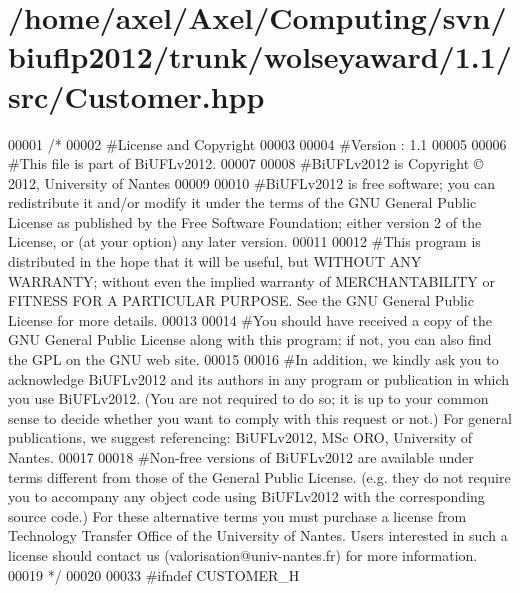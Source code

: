 \hypertarget{Customer_8hpp_source}{\section{/home/axel/\-Axel/\-Computing/svn/biuflp2012/trunk/wolseyaward/1.1/src/\-Customer.hpp}
}

\begin{DoxyCode}
00001 \textcolor{comment}{/*}
00002 \textcolor{comment}{ #License and Copyright}
00003 \textcolor{comment}{ }
00004 \textcolor{comment}{ #Version : 1.1}
00005 \textcolor{comment}{ }
00006 \textcolor{comment}{ #This file is part of BiUFLv2012.}
00007 \textcolor{comment}{ }
00008 \textcolor{comment}{ #BiUFLv2012 is Copyright © 2012, University of Nantes}
00009 \textcolor{comment}{ }
00010 \textcolor{comment}{ #BiUFLv2012 is free software; you can redistribute it and/or modify it under
       the terms of the GNU General Public License as published by the Free Software
       Foundation; either version 2 of the License, or (at your option) any later version.}
00011 \textcolor{comment}{ }
00012 \textcolor{comment}{ #This program is distributed in the hope that it will be useful, but WITHOUT
       ANY WARRANTY; without even the implied warranty of MERCHANTABILITY or FITNESS FOR
       A PARTICULAR PURPOSE. See the GNU General Public License for more details.}
00013 \textcolor{comment}{ }
00014 \textcolor{comment}{ #You should have received a copy of the GNU General Public License along with
       this program; if not, you can also find the GPL on the GNU web site.}
00015 \textcolor{comment}{ }
00016 \textcolor{comment}{ #In addition, we kindly ask you to acknowledge BiUFLv2012 and its authors in
       any program or publication in which you use BiUFLv2012. (You are not required to
       do so; it is up to your common sense to decide whether you want to comply with
       this request or not.) For general publications, we suggest referencing: 
       BiUFLv2012, MSc ORO, University of Nantes.}
00017 \textcolor{comment}{ }
00018 \textcolor{comment}{ #Non-free versions of BiUFLv2012 are available under terms different from
       those of the General Public License. (e.g. they do not require you to accompany any
       object code using BiUFLv2012 with the corresponding source code.) For these
       alternative terms you must purchase a license from Technology Transfer Office of the
       University of Nantes. Users interested in such a license should contact us
       (valorisation@univ-nantes.fr) for more information.}
00019 \textcolor{comment}{ */}
00020  
00033 \textcolor{preprocessor}{#ifndef CUSTOMER\_H}

\end{DoxyCode}
